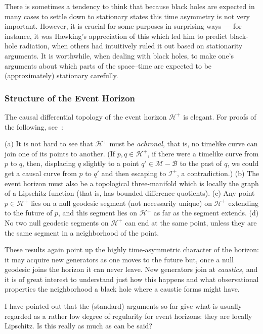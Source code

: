 \documentclass[
%
draft    %
,numberedheadings 
,bibliocites
  ]
  {aipproc}
\newcommand{\scrif}{{{\mathscr I}^{+}}}
\newcommand{\B}{{\mathscr B}} %
\newcommand{\Hf}{{{\mathscr H}^{+}}} %
\newcommand{\MM}{{\mathscr M}}
\begin{document}
There is sometimes a tendency to think that because black holes are expected in many cases to settle down to stationary states  this time asymmetry is not very important.  However, it is crucial for some purposes in surprising ways --- for instance, it was Hawking's appreciation of this which led him to predict black-hole radiation, when others had intuitively ruled it out based on stationarity arguments.  It is worthwhile, when dealing with black holes, to make one's arguments about which parts of the space--time are expected to be (approximately) stationary carefully.

\subsubsection*{Structure of the Event Horizon}

The causal differential topology of the event horizon $\Hf$ is elegant.  For proofs of the following, see~\citet{Penrose:1972}:

(a) It is not hard to see that $\Hf$ must be {\em achronal}, that is, no timelike curve can join one of its points to another.  
(If $p,q\in\Hf$, if there were a timelike curve from $p$ to $q$, then, displacing $q$ slightly to a point $q'\in \MM -\B$ to the past of $q$, we could get a causal curve from $p$ to $q'$ and then escaping to $\scrif$, a contradiction.)
(b)
The event horizon must also be a topological three-manifold which is locally the graph of a Lipschitz function (that is, has bounded difference quotients).
(c)
Any point $p\in\Hf$ lies on a null geodesic segment (not necessarily unique) on $\Hf$ extending to the future of $p$, and this segment lies on $\Hf$ as far as the segment extends.
(d)
No two null geodesic segments on $\Hf$ can end at the same point, unless they are the same segment in a neighborhood of the point.



These results again point up the highly time-asymmetric character of the horizon:  it may acquire new generators as one moves to the future but, once a null geodesic joins the horizon it can never leave.  New generators join at {\em caustics,} and it is of great interest to understand just how this happens and what observational properties the neighborhood a black hole where a caustic forms might have. 



I have pointed out that the (standard) arguments so far give what is usually regarded as a rather low degree of regularity for event horizons:  they are locally Lipschitz.  Is this really as much as can be said?
\end{document}

